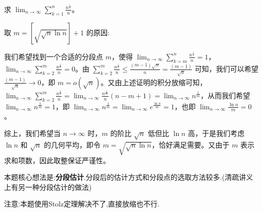 \documentclass[../../main.tex]{subfiles}%
\begin{document}
\begin{example}
求 \(\lim_{n\rightarrow \infty}\sum\limits_{k = 1}^n\frac{n^{\frac{1}{k}}}{n}\)。
\end{example}
\begin{remark}
\hypertarget{取m的原因}{取 \(m = [\sqrt{\sqrt{n}\ln n}]+1\) 的原因:}我们希望找到一个合适的分段点 \(m\)，使得 \(\lim_{n\rightarrow \infty}\sum\limits_{k = m}^n\frac{n^{\frac{1}{k}}}{n}=1\)，\(\lim_{n\rightarrow \infty}\sum\limits_{k = 2}^m\frac{n^{\frac{1}{k}}}{n}=0\)。由 \(\sum\limits_{k = 2}^m\frac{n^{\frac{1}{k}}}{n}\leqslant \frac{(m - 1)\sqrt{n}}{n}=\frac{(m - 1)}{\sqrt{n}}\) 可知，我们可以希望 \(\frac{(m - 1)}{\sqrt{n}}\rightarrow 0\)，即 \(m = o(\sqrt{n})\)。又由上述证明的积分放缩可知，\(\lim_{n\rightarrow \infty}\sum\limits_{k = 2}^m\frac{n^{\frac{1}{k}}}{n}=\lim_{n\rightarrow \infty}\frac{n^{\frac{1}{m}}}{n}(n - m + 1)=\lim_{n\rightarrow \infty}n^{\frac{1}{m}}\)，从而我们希望 \(\lim_{n\rightarrow \infty}n^{\frac{1}{m}}=1\)，即 \(\lim_{n\rightarrow \infty}n^{\frac{1}{m}}=\lim_{n\rightarrow \infty}e^{\frac{\ln n}{m}}=1\)，也即 \(\lim_{n\rightarrow \infty}\frac{\ln n}{m}=0\)。

综上，我们希望当 \(n\rightarrow \infty\) 时，\(m\) 的阶比 \(\sqrt{n}\) 低但比 \(\ln n\) 高，于是我们考虑 \(\ln n\) 和 \(\sqrt{n}\) 的几何平均，即令 \(m=\sqrt{\sqrt{n}\ln n}\)，恰好满足需要。又由于 \(m\) 表示求和项数，因此取整保证严谨性。
\end{remark}
\begin{note}
本题核心想法是:\textbf{分段估计}.分段后的估计方式和分段点的选取方法较多.(清疏讲义上有另一种分段估计的做法)

注意:本题使用Stolz定理解决不了,直接放缩也不行.
\end{note}
\end{document}

